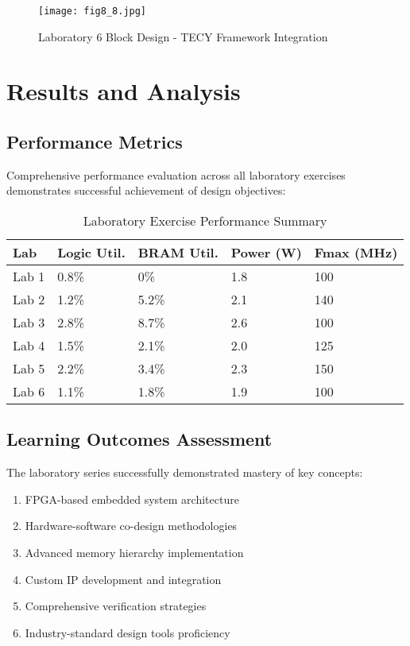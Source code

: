 \documentclass[11pt,a4paper]{article}
\begin{document}
\begin{figure}[H]
    \centering
    \texttt{[image: fig8\_8.jpg]}
    \caption{Laboratory 6 Block Design - TECY Framework Integration}
    \label{fig:lab6_block}
\end{figure}

\section{Results and Analysis}

\subsection{Performance Metrics}

Comprehensive performance evaluation across all laboratory exercises demonstrates successful achievement of design objectives:

\begin{table}[H]
    \centering
    \caption{Laboratory Exercise Performance Summary}
    \begin{tabular}{@{}lllll@{}}
        \toprule
        \textbf{Lab} & \textbf{Logic Util.} & \textbf{BRAM Util.} & \textbf{Power (W)} & \textbf{Fmax (MHz)} \\
        \midrule
        Lab 1 & 0.8\% & 0\% & 1.8 & 100 \\
        Lab 2 & 1.2\% & 5.2\% & 2.1 & 140 \\
        Lab 3 & 2.8\% & 8.7\% & 2.6 & 100 \\
        Lab 4 & 1.5\% & 2.1\% & 2.0 & 125 \\
        Lab 5 & 2.2\% & 3.4\% & 2.3 & 150 \\
        Lab 6 & 1.1\% & 1.8\% & 1.9 & 100 \\
        \bottomrule
    \end{tabular}
    \label{tab:performance_summary}
\end{table}

\subsection{Learning Outcomes Assessment}

The laboratory series successfully demonstrated mastery of key concepts:

\begin{enumerate}[leftmargin=*]
    \item FPGA-based embedded system architecture
    \item Hardware-software co-design methodologies  
    \item Advanced memory hierarchy implementation
    \item Custom IP development and integration
    \item Comprehensive verification strategies
    \item Industry-standard design tools proficiency
\end{enumerate}
\end{document}
